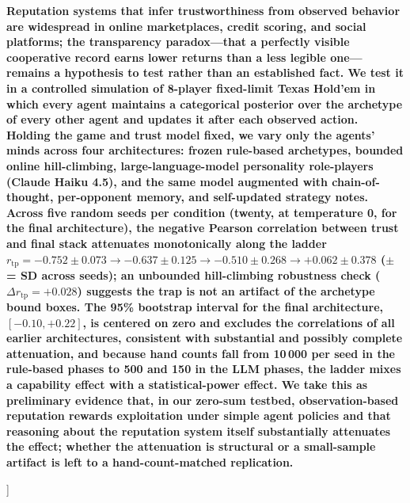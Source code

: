 \documentclass[10pt,twocolumn,letterpaper]{article}
\newcommand{\rtp}{\ensuremath{r_{\mathrm{tp}}}}
\begin{document}
\begin{@twocolumnfalse}
    \noindent\colorbox{gray!8}{%
    \begin{minipage}{\dimexpr\textwidth-2\fboxsep\relax}
      \vspace{4pt}\vspace{4pt}
      \sffamily\bfseries\fontsize{9.5}{13}\selectfont
      Reputation systems that infer trustworthiness from observed
      behavior are widespread in online marketplaces, credit scoring,
      and social platforms; the transparency paradox---that a
      perfectly visible cooperative record earns lower returns than a
      less legible one---remains a hypothesis to test rather than an
      established fact. We test it in a controlled simulation of
      8-player fixed-limit Texas Hold'em in which every agent
      maintains a categorical posterior over the archetype of every
      other agent and updates it after each observed action. Holding
      the game and trust model fixed, we vary only the agents' minds
      across four architectures: frozen rule-based archetypes,
      bounded online hill-climbing, large-language-model personality
      role-players (Claude Haiku 4.5), and the same model augmented
      with chain-of-thought, per-opponent memory, and self-updated
      strategy notes. Across five random seeds per condition (twenty, at temperature 0, for the final architecture), the negative Pearson correlation between trust and final stack attenuates monotonically along the ladder $\rtp = -0.752 \pm 0.073 \rightarrow -0.637 \pm 0.125 \rightarrow -0.510 \pm 0.268 \rightarrow +0.062 \pm 0.378$ ($\pm$ = SD across seeds); an unbounded hill-climbing robustness check
      ($\Delta\rtp = +0.028$) suggests the trap is not an artifact
      of the archetype bound boxes. The 95\% bootstrap interval for the final architecture, $[-0.10, +0.22]$, is centered on zero and excludes the correlations of all earlier architectures, consistent with substantial and possibly complete attenuation, and
      because hand counts fall from 10\,000 per seed in the
      rule-based phases to 500 and 150 in the LLM phases, the ladder
      mixes a capability effect with a statistical-power effect. We
      take this as preliminary evidence that, in our zero-sum
      testbed, observation-based reputation rewards exploitation
      under simple agent policies and that reasoning about the
      reputation system itself substantially attenuates the effect;
      whether the attenuation is structural or a small-sample
      artifact is left to a hand-count-matched replication.
      \vspace{4pt}
    \end{minipage}}
    \vspace{18pt}

    \vspace{10pt}
  \end{@twocolumnfalse}
]
\end{document}
